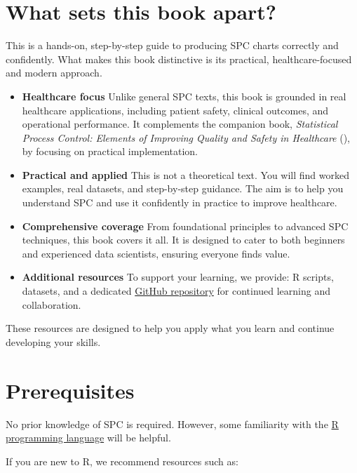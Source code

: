 \documentclass[
]{book}
\begin{document}
\section*{What sets this book apart?}\label{what-sets-this-book-apart}

This is a hands-on, step-by-step guide to producing SPC charts correctly and confidently. What makes this book distinctive is its practical, healthcare-focused and modern approach.

\begin{itemize}
\item
  \textbf{Healthcare focus}
  Unlike general SPC texts, this book is grounded in real healthcare applications, including patient safety, clinical outcomes, and operational performance. It complements the companion book, \emph{Statistical Process Control: Elements of Improving Quality and Safety in Healthcare} (), by focusing on practical implementation.
\item
  \textbf{Practical and applied}
  This is not a theoretical text. You will find worked examples, real datasets, and step-by-step guidance. The aim is to help you understand SPC and use it confidently in practice to improve healthcare.
\item
  \textbf{Comprehensive coverage}
  From foundational principles to advanced SPC techniques, this book covers it all. It is designed to cater to both beginners and experienced data scientists, ensuring everyone finds value.
\item
  \textbf{Additional resources}
  To support your learning, we provide: R scripts, datasets, and a dedicated \href{https://github.com/anhoej/spc4hc}{GitHub repository} for continued learning and collaboration.
\end{itemize}

These resources are designed to help you apply what you learn and continue developing your skills.

\section*{Prerequisites}\label{prerequisites}

No prior knowledge of SPC is required. However, some familiarity with the \href{https://www.r-project.org/}{R programming language} will be helpful.

If you are new to R, we recommend resources such as:
\end{document}
